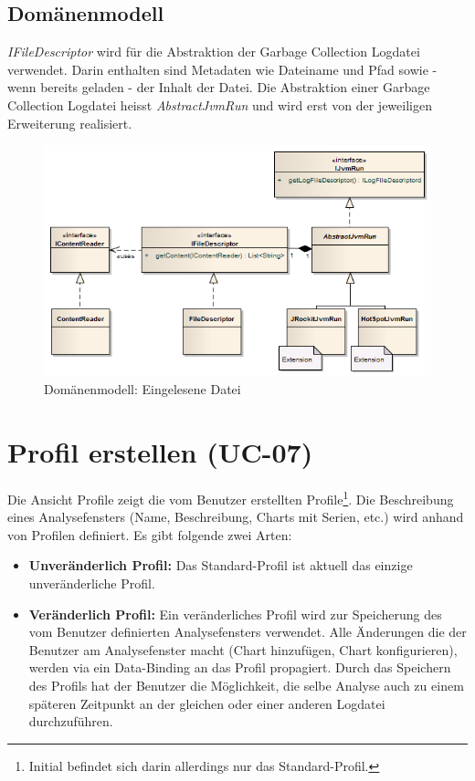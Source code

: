 \subsection{Domänenmodell}
\textit{IFileDescriptor} wird für die Abstraktion der Garbage Collection Logdatei verwendet. Darin enthalten sind Metadaten wie Dateiname und Pfad sowie - wenn bereits geladen - der Inhalt der Datei. Die Abstraktion einer Garbage Collection Logdatei heisst \textit{AbstractJvmRun} und wird erst von der jeweiligen Erweiterung realisiert.
 \begin{figure}[H]
  	\centering
    	\includegraphics[width=16cm]{images/core_domain}
        	\caption{Domänenmodell: Eingelesene Datei}
\end{figure}


\section{Profil erstellen (UC-07)}
Die Ansicht Profile zeigt die vom Benutzer erstellten Profile\footnote{Initial befindet sich darin allerdings nur das Standard-Profil.}. Die Beschreibung eines Analysefensters (Name, Beschreibung, Charts mit Serien, etc.) wird anhand von Profilen definiert. Es gibt folgende zwei Arten:
\begin{itemize}
	\item \textbf{Unveränderlich Profil:} Das Standard-Profil ist aktuell das einzige unveränderliche Profil.
	\item \textbf{Veränderlich Profil:} Ein veränderliches Profil wird zur Speicherung des vom Benutzer definierten Analysefensters verwendet. Alle Änderungen die der Benutzer am Analysefenster macht (Chart hinzufügen, Chart konfigurieren), werden via ein Data-Binding an das Profil propagiert. Durch das Speichern des Profils hat der Benutzer die Möglichkeit, die selbe Analyse auch zu einem späteren Zeitpunkt an der gleichen oder einer anderen Logdatei durchzuführen.
\end{itemize}

